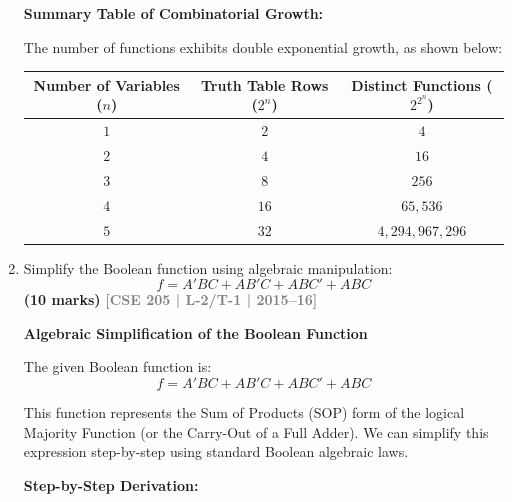 \documentclass[12pt,a3paper]{article}
\newcommand{\yr}[1]{\hfill\textcolor{gray}{\small\textbf{[#1]}}}
\newcommand{\mk}[1]{\textcolor{orange!70!black}{\small\textbf{(#1 marks)}}}
\begin{document}
\begin{enumerate}
\begin{tcolorbox}[enhanced,breakable,ansbox,colback=cA!4,colframe=cA,boxrule=0.8pt,arc=5pt,title={\textbf{Answer}},fonttitle=\bfseries\color{white},colbacktitle=cA]
\vspace{0.3cm}
\textbf{Summary Table of Combinatorial Growth:}

The number of functions exhibits double exponential growth, as shown below:

\begin{center}
\renewcommand{\arraystretch}{1.4}
\begin{tabular}{|c|c|c|}
\hline
\textbf{Number of Variables ($n$)} & \textbf{Truth Table Rows ($2^n$)} & \textbf{Distinct Functions ($2^{2^n}$)} \\
\hline
$1$ & $2$ & $4$ \\
\hline
$2$ & $4$ & $16$ \\
\hline
$3$ & $8$ & $256$ \\
\hline
$4$ & $16$ & $65,536$ \\
\hline
$5$ & $32$ & $4,294,967,296$ \\
\hline
\end{tabular}
\end{center}

\end{tcolorbox}

\item Simplify the Boolean function using algebraic manipulation:
\[ f = A'BC + AB'C + ABC' + ABC \]
\mk{10} \yr{CSE 205 | L-2/T-1 | 2015--16}

\begin{tcolorbox}[enhanced,breakable,ansbox,colback=cA!4,colframe=cA,boxrule=0.8pt,arc=5pt,title={\textbf{Answer}},fonttitle=\bfseries\color{white},colbacktitle=cA]

\textbf{Algebraic Simplification of the Boolean Function}

The given Boolean function is:
\[ f = A'BC + AB'C + ABC' + ABC \]

This function represents the Sum of Products (SOP) form of the logical Majority Function (or the Carry-Out of a Full Adder). We can simplify this expression step-by-step using standard Boolean algebraic laws.

\vspace{0.3cm}
\textbf{Step-by-Step Derivation:}


\end{tcolorbox}
\end{enumerate}
\end{document}
